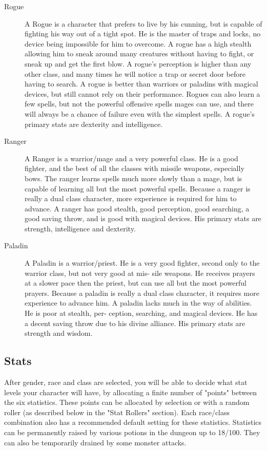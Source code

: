 \begin{description}
 \item[Rogue] A Rogue is a character that prefers to live by his cunning,
     but is capable of fighting his way out of a tight spot. He
     is the master of traps and locks, no device being impossible
     for him to overcome. A rogue has a high stealth allowing
     him to sneak around many creatures without having to fight,
     or sneak up and get the first blow. A rogue's perception is
     higher than any other class, and many times he will notice a
     trap or secret door before having to search. A rogue is
     better than warriors or paladins with magical devices, but
     still cannot rely on their performance. Rogues can also
     learn a few spells, but not the powerful offensive spells
     mages can use, and there will always be a chance of failure
     even with the simplest spells. A rogue's primary stats are
     dexterity and intelligence.

 \item[Ranger] A Ranger is a warrior/mage and a very powerful class. He is
     a good fighter, and the best of all the classes with missile
     weapons, especially bows. The ranger learns spells much more
     slowly than a mage, but is capable of learning all but the
     most powerful spells. Because a ranger is really a dual
     class character, more experience is required for him to
     advance. A ranger has good stealth, good perception, good
     searching, a good saving throw, and is good with magical
     devices. His primary stats are strength, intelligence and
     dexterity.

 \item[Paladin] A Paladin is a warrior/priest. He is a very good fighter,
     second only to the warrior class, but not very good at mis-
     sile weapons. He receives prayers at a slower pace then the
     priest, but can use all but the most powerful prayers.
     Because a paladin is really a dual class character, it
     requires more experience to advance him. A paladin lacks
     much in the way of abilities. He is poor at stealth, per-
     ception, searching, and magical devices. He has a decent
     saving throw due to his divine alliance. His primary stats
     are strength and wisdom.
\end{description} 

\subsection{Stats}

After gender, race and class are selected, you will be able to decide
what stat levels your character will have, by allocating a finite number
of "points" between the six statistics. These points can be allocated
by selection or with a random roller (as described below in the "Stat
Rollers" section). Each race/class combination also has a recommended
default setting for these statistics. Statistics can be permanently
raised by various potions in the dungeon up to 18/100. They can also be
temporarily drained by some monster attacks.


